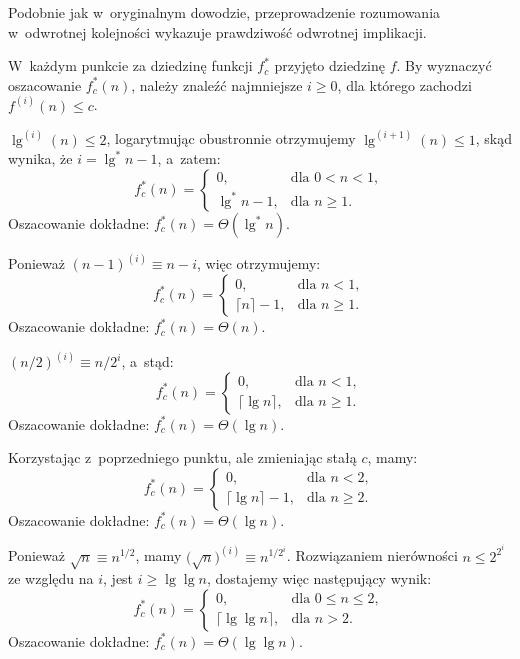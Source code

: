 Podobnie jak w~oryginalnym dowodzie, przeprowadzenie rozumowania w~odwrotnej kolejności wykazuje prawdziwość odwrotnej implikacji.

W~każdym punkcie za dziedzinę funkcji $f_c^*$ przyjęto dziedzinę $f$. By wyznaczyć oszacowanie $f_c^*(n)$, należy znaleźć najmniejsze $i\ge0$, dla którego zachodzi $f^{(i)}(n)\le c$.

\subproblem %
$\lg^{(i)}(n)\le2$, logarytmując obustronnie otrzymujemy $\lg^{(i+1)}(n)\le1$, skąd wynika, że $i=\lg^*n-1$, a~zatem:
\[
	f_c^*(n) =
	\begin{cases}
		0, & \text{dla $0<n<1$}, \\
		\lg^*n-1, & \text{dla $n\ge1$}.
	\end{cases}
\]
Oszacowanie dokładne: $f_c^*(n)=\Theta(\lg^*n)$.

\subproblem %
Ponieważ $(n-1)^{(i)}\equiv n-i$, więc otrzymujemy:
\[
	f_c^*(n) =
	\begin{cases}
		0, & \text{dla $n<1$}, \\
		\lceil n\rceil-1, & \text{dla $n\ge1$}.
	\end{cases}
\]
Oszacowanie dokładne: $f_c^*(n)=\Theta(n)$.

\subproblem %
$(n/2)^{(i)}\equiv n/2^i$, a~stąd:
\[
	f_c^*(n) =
	\begin{cases}
		0, & \text{dla $n<1$}, \\
		\lceil\lg n\rceil, & \text{dla $n\ge1$}.
	\end{cases}
\]
Oszacowanie dokładne: $f_c^*(n)=\Theta(\lg n)$.

\subproblem %
Korzystając z~poprzedniego punktu, ale zmieniając stałą $c$, mamy:
\[
	f_c^*(n) =
	\begin{cases}
		0, & \text{dla $n<2$}, \\
		\lceil\lg n\rceil-1, & \text{dla $n\ge2$}.
	\end{cases}
\]
Oszacowanie dokładne: $f_c^*(n)=\Theta(\lg n)$.

\subproblem %
Ponieważ $\sqrt{n}\equiv n^{1/2}$, mamy $\bigl(\!\sqrt{n}\bigr)^{(i)}\equiv n^{1/2^i}$\!. Rozwiązaniem nierówności $n\le2^{2^i}$ ze względu na $i$, jest $i\ge\lg\lg n$, dostajemy więc następujący wynik:
\[
	f_c^*(n) =
	\begin{cases}
		0, & \text{dla $0\le n\le2$}, \\
		\lceil\lg\lg n\rceil, & \text{dla $n>2$}.
	\end{cases}
\]
Oszacowanie dokładne: $f_c^*(n)=\Theta(\lg\lg n)$.


